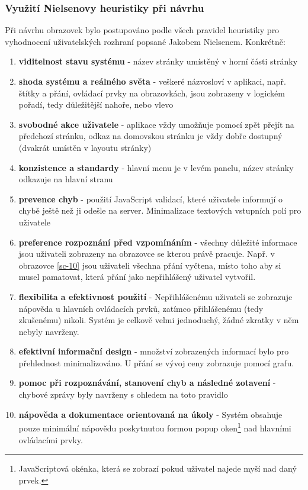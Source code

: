 \subsubsection{Využití Nielsenovy heuristiky při návrhu}
Při návrhu obrazovek bylo postupováno podle všech pravidel heuristiky pro vyhodnocení uživatelských rozhraní popsané Jakobem Nielsenem\cite{molich1990improving}. Konkrétně:
\begin{enumerate}
\item \textbf{viditelnost stavu systému} - název stránky umístěný v horní části stránky
\item \textbf{shoda systému a reálného světa} - veškeré názvosloví v aplikaci, např. štítky a přání, ovládací prvky na obrazovkách, jsou zobrazeny v logickém pořadí, tedy důležitější nahoře, nebo vlevo
\item \textbf{svobodné akce uživatele} - aplikace vždy umožňuje pomocí zpět přejít na předchozí stránku, odkaz na domovskou stránku je vždy dobře dostupný (dvakrát umístěn v layoutu stránky)
\item \textbf{konzistence a standardy} - hlavní menu je v levém panelu, název stránky odkazuje na hlavní stranu
\item \textbf{prevence chyb} - použití JavaScript validací, které uživatele informují o chybě ještě než ji odešle na server. Minimalizace textových vstupních polí pro uživatele
\item \textbf{preference rozpoznání před vzpomínáním} - všechny důležité informace jsou uživateli zobrazeny na obrazovce se kterou právě pracuje. Např. v obrazovce \ref{sc-10} jsou uživateli všechna přání vyčtena, místo toho aby si musel pamatovat, která přání jako nepřihlášený uživatel vytvořil.
\item \textbf{flexibilita a efektivnost použití} - Nepřihlášenému uživateli se zobrazuje nápověda u hlavních ovládacích prvků, zatímco přihlášenému (tedy zkušenému) nikoli. Systém je celkově velmi jednoduchý, žádné zkratky v něm nebyly navrženy.
\item \textbf{efektivní informační design} - množství zobrazených informací bylo pro přehlednost minimalizováno. U přání se vývoj ceny zobrazuje pomocí grafu.
\item \textbf{pomoc při rozpoznávání, stanovení chyb a následné zotavení} - chybové zprávy byly navrženy s ohledem na toto pravidlo
\item \textbf{nápověda a dokumentace orientovaná na úkoly} - Systém obsahuje pouze minimální nápovědu poskytnutou formou popup oken\footnote{JavaScriptová okénka, která se zobrazí pokud uživatel najede myší nad daný prvek.} nad hlavními ovládacími prvky.
\end{enumerate}

